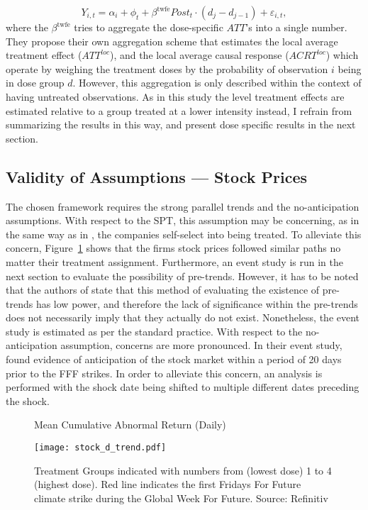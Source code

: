 \documentclass[12pt]{article}
\begin{document}
\begin{equation}
    Y_{i,t} = \alpha_i + \phi_t +  \beta^{\text{twfe}} Post_t \cdot (d_j - d_{j-1}) + \varepsilon_{i,t},
\end{equation}
where the $\beta^{\text{twfe}}$ tries to aggregate the dose-specific $ATT$'s into a single number. They propose their own aggregation scheme that estimates the local average treatment effect ($ATT^{loc}$), and the local average causal response ($ACRT^{loc}$) which operate by weighing the treatment doses by the probability of observation $i$ being in dose group $d$. However, this aggregation is only described within the context of having untreated observations. As in this study the level treatment effects are estimated relative to a group treated at a lower intensity instead, I refrain from summarizing the results in this way, and present dose specific results in the next section.


\subsection{Validity of Assumptions --- Stock Prices}

The chosen framework requires the strong parallel trends and the no-anticipation assumptions. With respect to the SPT, this assumption may be concerning, as in the same way as in \textcite{koenigImpulsePurchasesGun2023}, the companies self-select into being treated. To alleviate this concern, Figure~\ref{fig:stock_trend} shows that the firms stock prices followed similar paths no matter their treatment assignment.
Furthermore, an event study is run in the next section to evaluate the possibility of pre-trends. However, it has to be noted that the authors of \textcite{callawayDifferenceinDifferencesContinuousTreatment2025} state that this method of evaluating the existence of pre-trends has low power, and therefore the lack of significance within the pre-trends does not necessarily imply that they actually do not exist. Nonetheless, the event study is estimated as per the standard practice.
With respect to the no-anticipation assumption, concerns are more pronounced. In their event study, \textcite{schusterStockPriceReactions2023} found evidence of anticipation of the stock market within a period of 20 days prior to the FFF strikes. In order to alleviate this concern, an analysis is performed with the shock date being shifted to multiple different dates preceding the shock.

\begin{figure}[t]
    \caption{Mean Cumulative Abnormal Return (Daily)}\label{fig:stock_trend}
    \centering
    \texttt{[image: stock\_d\_trend.pdf]}
    \captionsetup{font=footnotesize}
    \caption*{Treatment Groups indicated with numbers from (lowest dose) 1 to 4 (highest dose). Red line indicates the first Fridays For Future climate strike during the Global Week For Future. Source: Refinitiv}
\end{figure}
\end{document}
